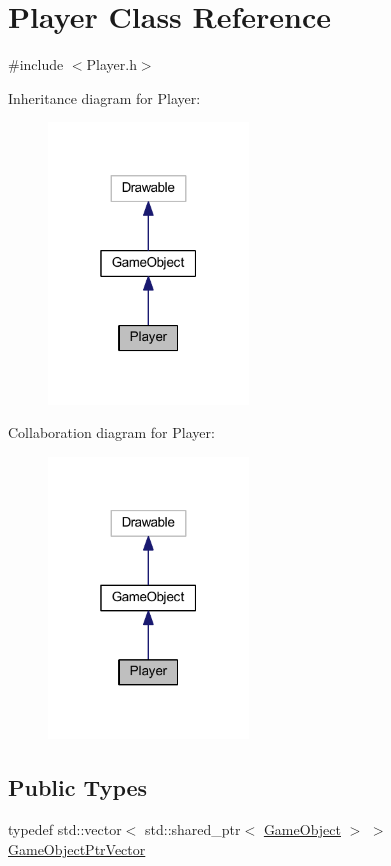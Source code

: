 \hypertarget{class_player}{}\section{Player Class Reference}
\label{class_player}


{\ttfamily \#include $<$Player.\+h$>$}



Inheritance diagram for Player\+:
\nopagebreak
\begin{figure}[H]
\begin{center}
\leavevmode
\includegraphics[width=151pt]{class_player__inherit__graph}
\end{center}
\end{figure}


Collaboration diagram for Player\+:
\nopagebreak
\begin{figure}[H]
\begin{center}
\leavevmode
\includegraphics[width=151pt]{class_player__coll__graph}
\end{center}
\end{figure}
\subsection*{Public Types}
\begin{DoxyCompactItemize}
\item 
typedef std\+::vector$<$ std\+::shared\+\_\+ptr$<$ \hyperlink{class_game_object}{Game\+Object} $>$ $>$ \hyperlink{class_player_a2678e391270a5e0fd6c77127657cb4d7}{Game\+Object\+Ptr\+Vector}
\end{DoxyCompactItemize}

